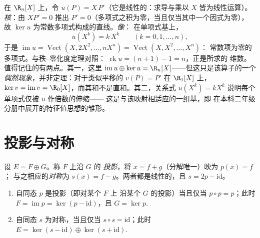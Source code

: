 \begin{example}[欧拉算子的核与像]
\label{ex:b1:linmaps:euler}
在 $\R_n[X]$ 上，令 $u(P) = X\,P'$（它是线性的：求导与乘以 $X$ 皆为线性运算）。
\emph{核}：由 $XP' = 0$ 推出 $P' =
0$（多项式之积为零，当且仅当其中一个因式为零），
故 $\ker u$ 为常数多项式构成的直线。\emph{像}：
在单项式基上，
\[
u(X^k) = k\,X^{k} \qquad (k = 0, 1, \dots, n),
\]
于是 $\operatorname{im} u = \operatorname{Vect}(X, 2X^2, \dots,
nX^n) = \operatorname{Vect}(X, X^2, \dots, X^n)$：
常数项为零的多项式。与秩–零化度定理对照：
$\operatorname{rk} u = (n + 1) - 1 = n$，正是所求的
维数。值得记住的有两点。其一，这里
$\operatorname{im} u \oplus \ker u = \R_n[X]$——但这只是该算子的一个
\emph{偶然现象}，并非定理：对于类似平移的
$v(P) = P'$ 在 $\R_1[X]$ 上，$\ker v = \operatorname{im}
v = \R_0[X]$，而其和不是直和。其二，关系式
$u(X^k) = kX^k$ 说明每个单项式仅被 $u$ 作倍数的伸缩——
这是与该映射相适应的一组基，即
在本科二年级分册中展开的特征值思想的雏形。
\end{example}

\section{投影与对称}

\begin{definition}\label{def:b1:linmaps:projection}
设 $E = F \oplus G$。称 $F$ 上沿 $G$ 的
\emph{投影}，将 $x = f + g$（分解唯一）映为 $p(x) = f$；
与之相应的\emph{对称}为 $s(x)
= f - g$。两者都是线性的，且 $s = 2p - \mathrm{id}$。
\end{definition}

\begin{theorem}[代数刻画]\label{thm:b1:linmaps:projchar}
\begin{enumerate}
  \item 自同态 $p$ 是投影（即对某个 $F$ 上
        沿某个 $G$ 的投影）当且仅当 $p \circ p = p$；此时 $F =
        \operatorname{im} p = \ker(p - \mathrm{id})$，且 $G = \ker
        p$.
  \item 自同态 $s$ 为对称，当且仅当 $s \circ s
        = \mathrm{id}$；此时 $E = \ker(s - \mathrm{id}) \oplus
        \ker(s + \mathrm{id})$.
\end{enumerate}
\end{theorem}

